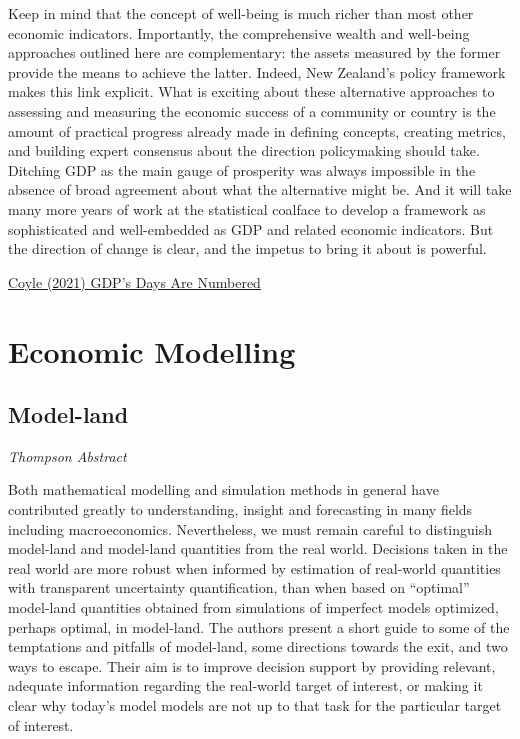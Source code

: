 \documentclass[
]{book}
\begin{document}
Keep in mind that the concept of well-being is much richer than most other economic indicators. Importantly, the comprehensive wealth and well-being approaches outlined here are complementary: the assets measured by the former provide the means to achieve the latter. Indeed, New Zealand's policy framework makes this link explicit. What is exciting about these alternative approaches to assessing and measuring the economic success of a community or country is the amount of practical progress already made in defining concepts, creating metrics, and building expert consensus about the direction policymaking should take. Ditching GDP as the main gauge of prosperity was always impossible in the absence of broad agreement about what the alternative might be. And it will take many more years of work at the statistical coalface to develop a framework as sophisticated and well-embedded as GDP and related economic indicators. But the direction of change is clear, and the impetus to bring it about is powerful.

\href{https://www.project-syndicate.org/commentary/replacing-gdp-with-wealth-and-wellbeing-indicators-by-diane-coyle-2021-12}{Coyle (2021) GDP's Days Are Numbered}

\hypertarget{economic-modelling}{%
\chapter{Economic Modelling}\label{economic-modelling}}

\hypertarget{model-land}{%
\section{Model-land}\label{model-land}}

\emph{Thompson Abstract}

Both mathematical modelling and simulation methods in general have contributed greatly
to understanding, insight and forecasting in many fields including macroeconomics.
Nevertheless, we must remain careful to distinguish model-land and model-land quantities
from the real world. Decisions taken in the real world are more robust when informed by
estimation of real-world quantities with transparent uncertainty quantification, than when
based on ``optimal'' model-land quantities obtained from simulations of imperfect models
optimized, perhaps optimal, in model-land. The authors present a short guide to some
of the temptations and pitfalls of model-land, some directions towards the exit, and two
ways to escape. Their aim is to improve decision support by providing relevant, adequate
information regarding the real-world target of interest, or making it clear why today's
model models are not up to that task for the particular target of interest.
\end{document}

